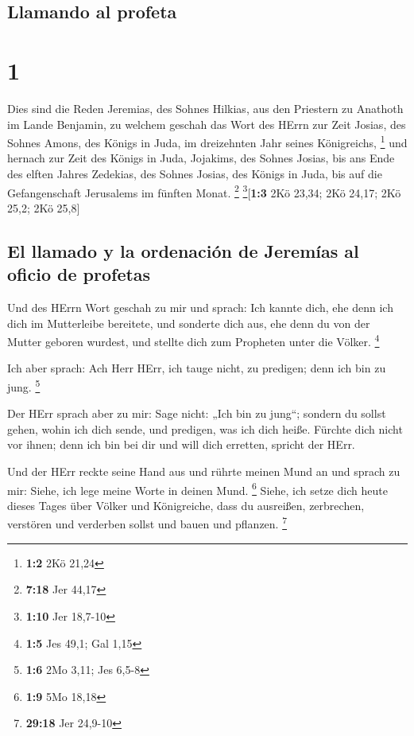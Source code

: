 \hypertarget{llamando-al-profeta}{%
\subsection{Llamando al profeta}\label{llamando-al-profeta}}

\hypertarget{section}{%
\section{1}\label{section}}

 Dies sind die Reden Jeremias, des Sohnes Hilkias, aus den
Priestern zu Anathoth im Lande Benjamin,  zu welchem
geschah das Wort des HErrn zur Zeit Josias, des Sohnes Amons, des Königs
in Juda, im dreizehnten Jahr seines Königreichs, \footnote{\textbf{1:2}
  2Kö 21,24}  und hernach zur Zeit des Königs in Juda,
Jojakims, des Sohnes Josias, bis ans Ende des elften Jahres Zedekias,
des Sohnes Josias, des Königs in Juda, bis auf die Gefangenschaft
Jerusalems im fünften Monat. \footnote{\textbf{7:18} Jer 44,17}
\footnote{\textbf{1:10} Jer 18,7-10}{[}\textbf{1:3} 2Kö 23,34; 2Kö
24,17; 2Kö 25,2; 2Kö 25,8{]}

\hypertarget{el-llamado-y-la-ordenaciuxf3n-de-jeremuxedas-al-oficio-de-profetas}{%
\subsection{El llamado y la ordenación de Jeremías al oficio de
profetas}\label{el-llamado-y-la-ordenaciuxf3n-de-jeremuxedas-al-oficio-de-profetas}}

 Und des HErrn Wort geschah zu mir und sprach:
 Ich kannte dich, ehe denn ich dich im Mutterleibe
bereitete, und sonderte dich aus, ehe denn du von der Mutter geboren
wurdest, und stellte dich zum Propheten unter die Völker. \footnote{\textbf{1:5}
  Jes 49,1; Gal 1,15}

 Ich aber sprach: Ach Herr HErr, ich tauge nicht, zu
predigen; denn ich bin zu jung. \footnote{\textbf{1:6} 2Mo 3,11; Jes
  6,5-8}

 Der HErr sprach aber zu mir: Sage nicht: „Ich bin zu
jung``; sondern du sollst gehen, wohin ich dich sende, und predigen, was
ich dich heiße.  Fürchte dich nicht vor ihnen; denn ich
bin bei dir und will dich erretten, spricht der HErr.

 Und der HErr reckte seine Hand aus und rührte meinen Mund
an und sprach zu mir: Siehe, ich lege meine Worte in deinen Mund.
\footnote{\textbf{1:9} 5Mo 18,18}  Siehe, ich setze dich
heute dieses Tages über Völker und Königreiche, dass du ausreißen,
zerbrechen, verstören und verderben sollst und bauen und pflanzen.
\footnote{\textbf{29:18} Jer 24,9-10}

